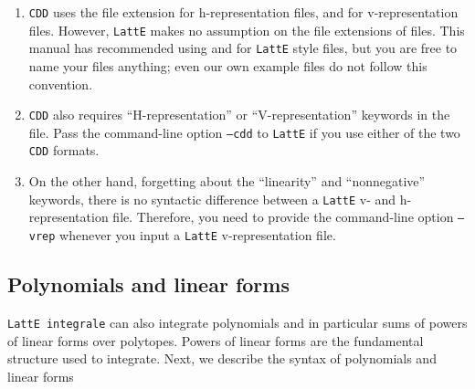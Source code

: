 \documentclass{article}
\newcommand{\latte}{{\tt LattE}\xspace}
\newcommand{\latteInt}{{\tt LattE integrale}\xspace}
\newcommand{\cdd}{{\tt CDD}\xspace}
\begin{document}
\begin{enumerate}
        \item \cdd uses the file extension  for h-representation
          files, and  for v-representation files. However, \latte
          makes no assumption on the file extensions of files. This manual has
          recommended using  and  for
          \latte style files, but you are free to name your files anything;
          even our own example files do not follow this convention. 
        \item \cdd also requires ``H-representation'' or ``V-representation''
          keywords in the file.  Pass the command-line option
          \texttt{--cdd} to \latte if you use either of the two \cdd formats. 
        \item On the other hand, forgetting about the ``linearity'' and
          ``nonnegative'' keywords, there is no syntactic difference between a
          \latte v- and h-representation file.  Therefore, you need to provide
          the command-line option \texttt{--vrep} whenever you input a \latte
          v-representation file.
\end{enumerate}


\subsection{Polynomials and linear forms}
\label{input-file:polynomial-and-linear-form}

\latteInt can also integrate polynomials and in particular sums of powers of
linear forms over polytopes. Powers of linear forms are the fundamental structure used to integrate. Next, we describe the syntax of polynomials and linear forms
\end{document}
